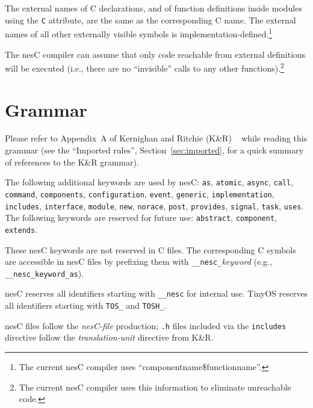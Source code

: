 \documentclass[11pt,letterpaper]{article}
\newcommand{\kw}[1]{{\tt #1}}
\newcommand{\file}[1]{{\tt #1}}
\newcommand{\nesc}{nesC\xspace}
\newcommand{\tinyos}{TinyOS\xspace}
\begin{document}
The external names of C declarations, and of function definitions
inside modules using the \kw{C} attribute, are the same as the
corresponding C name. The external names of all other externally
visible symbols is implementation-defined.\footnote{The current
nesC compiler uses ``componentname\$functionname''.}

The \nesc compiler can assume that only code reachable from external
definitions will be executed (i.e., there are no ``invisible'' calls to any
other functions).\footnote{The current \nesc compiler uses this information
to eliminate unreachable code.}



\appendix

\section{Grammar}
\label{sec:grammar}

Please refer to Appendix~A of Kernighan and Ritchie (K\&R)
~\cite[pp234--239]{kandr} while reading this grammar (see the ``Imported
rules'', Section~\ref{sec:imported}, for a quick summary of references to
the K\&R grammar).

The following additional keywords are used by \nesc: \kw{as}, \kw{atomic},
\kw{async}, \kw{call}, \kw{command}, \kw{components}, \kw{configuration},
\kw{event}, \kw{generic}, \kw{implementation}, \kw{includes},
\kw{interface}, \kw{module}, \kw{new}, \kw{norace}, \kw{post},
\kw{provides}, \kw{signal}, \kw{task}, \kw{uses}. The following keywords
are reserved for future use: \kw{abstract}, \kw{component}, \kw{extends}.

These \nesc keywords are not reserved in C files. The corresponding C
symbols are accessible in \nesc files by prefixing them with
\kw{\_\_nesc\_}\emph{keyword} (e.g., \kw{\_\_nesc\_keyword\_as}).

\nesc reserves all identifiers starting with \kw{\_\_nesc} for internal
use. \tinyos reserves all identifiers starting with \kw{TOS\_} and
\kw{TOSH\_}.

\nesc files follow the \emph{nesC-file} production; \file{.h} files included
via the \kw{includes} directive follow the \emph{translation-unit}
directive from K\&R. 
\end{document}
